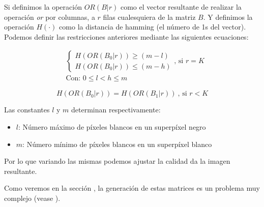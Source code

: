 Si definimos la operación $OR(B|r)$ como el vector resultante de realizar la
operación \textsl{or} por columnas, a $r$ filas cualesquiera de la matriz $B$. Y
definimos la operación $H(\cdot)$ como la distancia de hamming (el número de 1s
del vector). Podemos definir las restricciones anteriores mediante las
siguientes ecuaciones:

\begin{align}
	&\begin{cases}
		H(OR(B_0|r)) \ge (m-l) \\
		H(OR(B_0|r)) \le (m-h) 
	\end{cases}
	\text{, si } r = K
	\label{eq:cond_contraste}
	\\\nonumber
	&\text{Con: } 0 \le l < h \le m
\end{align}

\begin{equation}
	H(OR(B_0|r)) = H(OR(B_1|r)) \: \text{, si } r < K
	\label{eq:cond_seguridad}
\end{equation}

Las constantes $l$ y $m$ determinan respectivamente:
\begin{itemize}
	\item $l$: Número máximo de píxeles blancos en un superpíxel negro
	\item $m$: Número mínimo de píxeles blancos en un superpíxel blanco
\end{itemize}
Por lo que variando las mismas podemos ajustar la calidad da la imagen
resultante.

Como veremos en la sección , la generación de
estas matrices es un problema muy complejo (vease \cite{generacion_matrices}).

